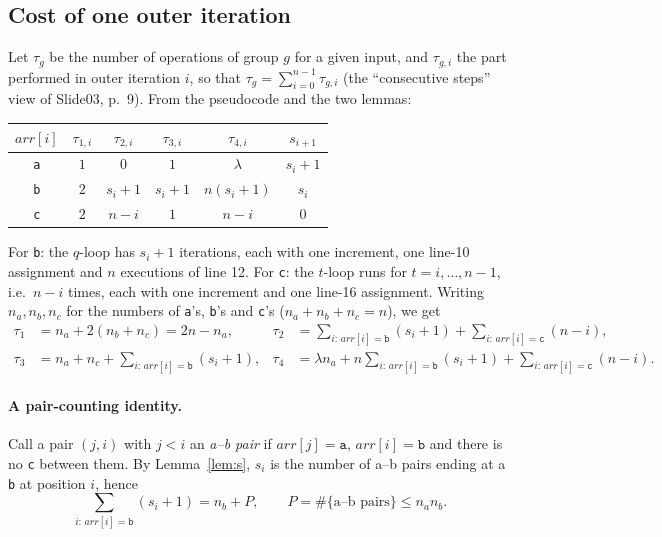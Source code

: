 \documentclass[11pt]{article}
\theoremstyle{remark}
\newcommand{\ta}{\texttt{a}}
\newcommand{\tb}{\texttt{b}}
\newcommand{\tc}{\texttt{c}}
\begin{document}
\subsection{Cost of one outer iteration}
Let $\tau_{g}$ be the number of operations of group $g$ for a given input, and $\tau_{g,i}$ the part performed in
outer iteration $i$, so that $\tau_g=\sum_{i=0}^{n-1}\tau_{g,i}$ (the ``consecutive steps'' view of Slide03, p.~9).
From the pseudocode and the two lemmas:

\begin{center}
\renewcommand{\arraystretch}{1.25}
\begin{tabular}{c|cccc|c}
\toprule
$arr[i]$ & $\tau_{1,i}$ & $\tau_{2,i}$ & $\tau_{3,i}$ & $\tau_{4,i}$ & $s_{i+1}$\\ \midrule
\ta & $1$ & $0$ & $1$ & $\lambda$ & $s_i+1$\\
\tb & $2$ & $s_i+1$ & $s_i+1$ & $n(s_i+1)$ & $s_i$\\
\tc & $2$ & $n-i$ & $1$ & $n-i$ & $0$\\ \bottomrule
\end{tabular}
\end{center}
For \tb: the $q$-loop has $s_i+1$ iterations, each with one increment, one line-10 assignment and $n$ executions of
line 12. For \tc: the $t$-loop runs for $t=i,\dots,n-1$, i.e.\ $n-i$ times, each with one increment and one line-16
assignment. Writing $n_a,n_b,n_c$ for the numbers of \ta's, \tb's and \tc's ($n_a+n_b+n_c=n$), we get
\begin{align*}
\tau_1 &= n_a + 2(n_b+n_c) = 2n-n_a, &
\tau_2 &= \sum_{i:\,arr[i]=\tb}(s_i+1) + \sum_{i:\,arr[i]=\tc}(n-i),\\
\tau_3 &= n_a+n_c+\sum_{i:\,arr[i]=\tb}(s_i+1), &
\tau_4 &= \lambda n_a + n\!\!\sum_{i:\,arr[i]=\tb}(s_i+1) + \sum_{i:\,arr[i]=\tc}(n-i).
\end{align*}

\paragraph{A pair-counting identity.} Call a pair $(j,i)$ with $j<i$ an \emph{a--b pair} if $arr[j]=\ta$,
$arr[i]=\tb$ and there is no \tc{} between them. By Lemma~\ref{lem:s}, $s_i$ is the number of a--b pairs ending at a
\tb{} at position $i$, hence
\begin{equation}\label{eq:pairs}
\sum_{i:\,arr[i]=\tb}(s_i+1) = n_b + P,\qquad P=\#\{\text{a--b pairs}\}\le n_a n_b .
\end{equation}
\end{document}
